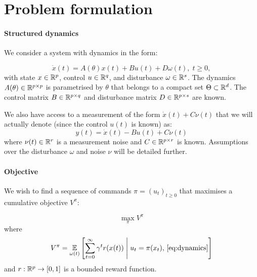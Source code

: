 \documentclass{article}
\begin{document}
\section{Problem formulation}

\paragraph{Structured dynamics}
We consider a system with dynamics in the form:

\begin{equation}
\label{eq:dynamics}
\dot{x}(t)=A(\theta)x(t) + B u(t) + D \omega(t),\;t\geq0,
\end{equation}
with state $x\in\mathbb{R}^p$, control $u\in\mathbb{R}^q$, and disturbance $\omega\in\mathbb{R}^s$. The dynamics $A(\theta)\in\mathbb{R}^{p\times p}$  is parametrised by $\theta$ that belongs to a compact set $\Theta \subset \mathbb{R}^d$. The control matrix $B\in\mathbb{R}^{p\times q}$ and disturbance matrix $D\in\mathbb{R}^{p\times s}$ are known.

We also have access to a measurement of the form
$
    \dot{x}(t) + C\nu(t)
$
that we will actually denote (since the control $u(t)$ is known) as:
\begin{equation}
\label{eq:measurement}
    y(t) = \dot{x}(t) - Bu(t) + C\nu(t)
\end{equation}
where $\nu(t)\in\mathbb{R}^r$ is a measurement noise and $C\in\mathbb{R}^{p\times r}$ is known. Assumptions over the disturbance $\omega$ and noise $\nu$ will be detailed further.

\paragraph{Objective}

We wish to find a sequence of commands $\pi=(u_t)_{t\geq 0}$ that maximises a cumulative objective $V^\pi$:


\begin{equation}
\max_\pi V^\pi
\end{equation}
where
\begin{equation}
\label{eq:optimal-control}
V^\pi = \operatorname*{\mathbb{E}}\limits_{\omega(t)}\left[\sum_{t=0}^\infty \gamma^t r(x(t))\;\middle|\; u_t = \pi(x_t),\,\eqref{eq:dynamics}\right]
\end{equation}
and $r:\mathbb{R}^p\rightarrow[0,1]$ is a bounded reward function.
\end{document}
